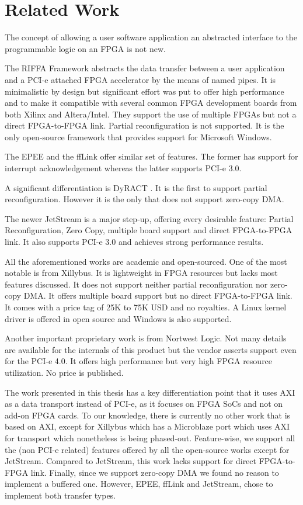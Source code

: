\chapter{Related Work}

The concept of allowing a user software application an abstracted interface to the programmable logic on an FPGA is not new.

The RIFFA Framework \cite{riffa} abstracts the data transfer between a user application and a PCI-e attached FPGA accelerator
by the means of named pipes. It is minimalistic by design but significant effort was put to offer high performance
and to make it compatible with several common FPGA development boards from both Xilinx and Altera/Intel. They support the use of
multiple FPGAs but not a direct FPGA-to-FPGA link. Partial reconfiguration is not supported. It is the only open-source 
framework that provides support for Microsoft Windows.

The EPEE \cite{epee} and the ffLink \cite{fflink} offer similar set of features. 
The former has support for interrupt acknowledgement whereas the latter supports PCI-e 3.0.

A significant differentiation is DyRACT \cite{dyract}. It is the first to support partial reconfiguration. However it is the only
that does not support zero-copy DMA.

The newer JetStream \cite{jetstream} is a major step-up, offering every desirable feature: Partial Reconfiguration, Zero Copy,
multiple board support and direct FPGA-to-FPGA link. It also supports PCI-e 3.0 and achieves strong performance results.

All the aforementioned works are academic and open-sourced.
One of the most notable is from Xillybus.
It is lightweight in FPGA resources but lacks most features discussed.
It does not support neither partial reconfiguration nor zero-copy DMA. 
It offers multiple board support but no direct FPGA-to-FPGA link. 
It comes with a price tag of 25K to 75K USD and no royalties.
A Linux kernel driver is offered in open source and Windows is also supported.


Another important proprietary work is from Nortwest Logic. Not many details are available for the internals of this product
but the vendor asserts support even for the PCI-e 4.0. It offers high performance but very high FPGA resource utilization.
No price is published.


The work presented in this thesis has a key differentiation point that it uses AXI as a data transport instead of PCI-e,
as it focuses on FPGA SoCs and not on add-on FPGA cards. To our knowledge, there is currently no other work that is based
on AXI, except for Xillybus which has a Microblaze port which uses AXI for transport which nonetheless is being phased-out.
Feature-wise, we support all the (non PCI-e related) features offered by all the open-source works except for JetStream.
Compared to JetStream, this work lacks support for direct FPGA-to-FPGA link. 
Finally, since we support zero-copy DMA we found no reason to implement a buffered one. 
However, EPEE, ffLink and JetStream, chose to implement both transfer types.

